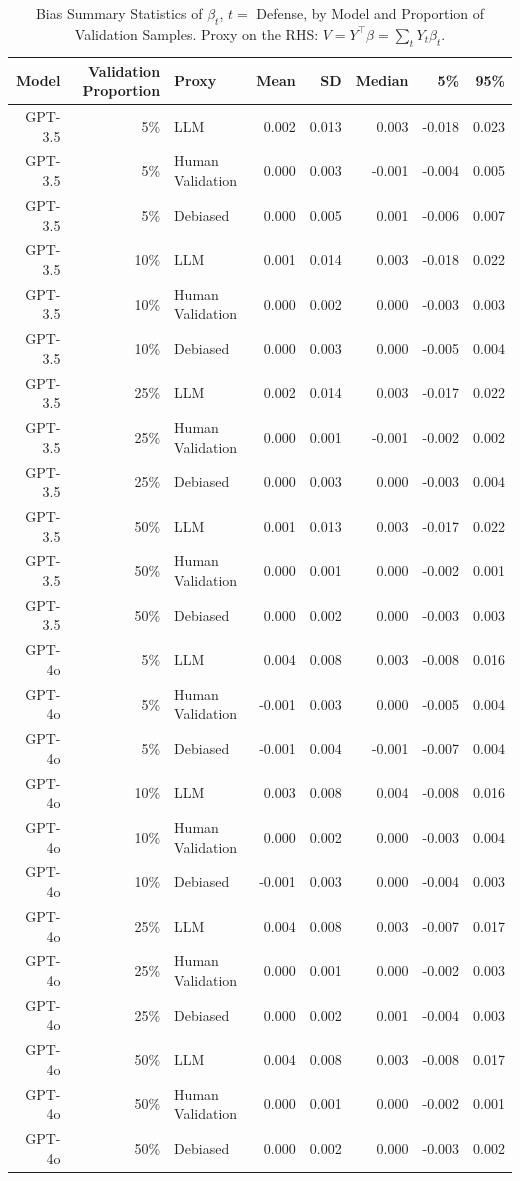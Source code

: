 \begin{table}

\caption{\label{tab:unnamed-chunk-1}Bias Summary Statistics of $\beta_{t}$, $t=$ Defense, by Model and Proportion of Validation Samples.
      Proxy on the RHS: $V = Y^\top \beta = \sum_{t} Y_t \beta_t$.}
\centering
\begin{tabular}[t]{rrlrrrrr}
\toprule
Model & Validation Proportion & Proxy & Mean & SD & Median & 5\% & 95\%\\
\midrule
GPT-3.5 & 5\% & LLM & 0.002 & 0.013 & 0.003 & -0.018 & 0.023\\
GPT-3.5 & 5\% & Human Validation & 0.000 & 0.003 & -0.001 & -0.004 & 0.005\\
GPT-3.5 & 5\% & Debiased & 0.000 & 0.005 & 0.001 & -0.006 & 0.007\\
GPT-3.5 & 10\% & LLM & 0.001 & 0.014 & 0.003 & -0.018 & 0.022\\
GPT-3.5 & 10\% & Human Validation & 0.000 & 0.002 & 0.000 & -0.003 & 0.003\\
GPT-3.5 & 10\% & Debiased & 0.000 & 0.003 & 0.000 & -0.005 & 0.004\\
GPT-3.5 & 25\% & LLM & 0.002 & 0.014 & 0.003 & -0.017 & 0.022\\
GPT-3.5 & 25\% & Human Validation & 0.000 & 0.001 & -0.001 & -0.002 & 0.002\\
GPT-3.5 & 25\% & Debiased & 0.000 & 0.003 & 0.000 & -0.003 & 0.004\\
GPT-3.5 & 50\% & LLM & 0.001 & 0.013 & 0.003 & -0.017 & 0.022\\
GPT-3.5 & 50\% & Human Validation & 0.000 & 0.001 & 0.000 & -0.002 & 0.001\\
GPT-3.5 & 50\% & Debiased & 0.000 & 0.002 & 0.000 & -0.003 & 0.003\\
GPT-4o & 5\% & LLM & 0.004 & 0.008 & 0.003 & -0.008 & 0.016\\
GPT-4o & 5\% & Human Validation & -0.001 & 0.003 & 0.000 & -0.005 & 0.004\\
GPT-4o & 5\% & Debiased & -0.001 & 0.004 & -0.001 & -0.007 & 0.004\\
GPT-4o & 10\% & LLM & 0.003 & 0.008 & 0.004 & -0.008 & 0.016\\
GPT-4o & 10\% & Human Validation & 0.000 & 0.002 & 0.000 & -0.003 & 0.004\\
GPT-4o & 10\% & Debiased & -0.001 & 0.003 & 0.000 & -0.004 & 0.003\\
GPT-4o & 25\% & LLM & 0.004 & 0.008 & 0.003 & -0.007 & 0.017\\
GPT-4o & 25\% & Human Validation & 0.000 & 0.001 & 0.000 & -0.002 & 0.003\\
GPT-4o & 25\% & Debiased & 0.000 & 0.002 & 0.001 & -0.004 & 0.003\\
GPT-4o & 50\% & LLM & 0.004 & 0.008 & 0.003 & -0.008 & 0.017\\
GPT-4o & 50\% & Human Validation & 0.000 & 0.001 & 0.000 & -0.002 & 0.001\\
GPT-4o & 50\% & Debiased & 0.000 & 0.002 & 0.000 & -0.003 & 0.002\\
\bottomrule
\end{tabular}
\end{table}
